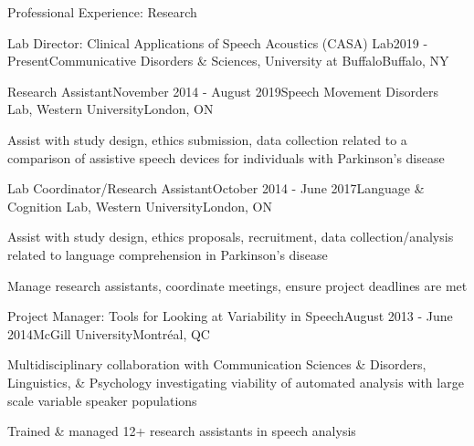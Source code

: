 \documentclass{resume} %
\begin{document}


\begin{rSection}{Professional Experience: Research}

	\begin{rSubsection}{Lab Director: Clinical Applications of Speech Acoustics (CASA) Lab}{2019 - Present}{Communicative Disorders \& Sciences, University at Buffalo}{Buffalo, NY}
	\end{rSubsection}

	\begin{rSubsection}{Research Assistant}{November 2014 - August 2019}{Speech Movement Disorders Lab, Western University}{London, ON}
	\item Assist with study design, ethics submission, data collection related to a comparison of assistive speech devices for individuals with Parkinson's disease
	\end{rSubsection}
	
	
	\begin{rSubsection}{Lab Coordinator/Research Assistant}{October 2014 - June 2017}{Language \& Cognition Lab, Western University}{London, ON}
	\item Assist with study design, ethics proposals, recruitment, data collection/analysis related to language comprehension in Parkinson's disease
	\item Manage research assistants, coordinate meetings, ensure project deadlines are met
	\end{rSubsection}
	
	
	\begin{rSubsection}{Project Manager: Tools for Looking at Variability in Speech}{August 2013 - June 2014}{McGill University}{Montr\'eal, QC}
	\item Multidisciplinary collaboration with Communication Sciences \& Disorders, Linguistics, \& Psychology investigating viability of automated analysis with large scale variable speaker populations
	\item Trained \& managed 12+ research assistants in speech analysis
	\end{rSubsection}
	

\end{rSection}
\end{document}
